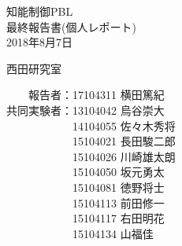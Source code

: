 \begin{titlepage}

  \vspace*{25mm}

  \begin{center}
    {\huge 知能制御PBL\\}
    \vspace{10mm}
    {\Huge 最終報告書(個人レポート)\\}
    \vspace{20mm}
    {\Large 2018年8月7日}

    \vspace{15mm}

    {\LARGE 西田研究室\\}

    \vspace{15mm}

    {\Large
   　　報告者：17104311 横田篤紀　\\
   共同実験者：13104042 烏谷崇大　\\
   　　　　　　14104055 佐々木秀将\\
   　　　　　　15104021 長田駿二郎\\
   　　　　　　15104026 川崎雄太朗\\
   　　　　　　15104050 坂元勇太　\\
   　　　　　　15104081 徳野将士　\\
   　　　　　　15104113 前田修一　\\
   　　　　　　15104117 右田明花　\\
   　　　　　　15104134 山福佳　　\\
   
}

  \end{center}

\end{titlepage}
